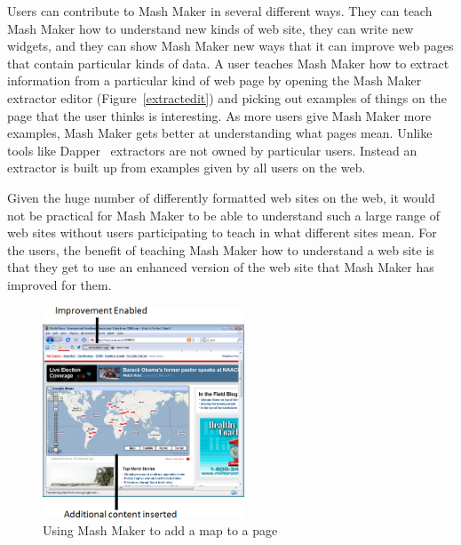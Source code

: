\documentclass{chi2009}
\begin{document}
Users can contribute to Mash Maker in several different ways. They can teach Mash Maker how to understand new kinds of web site, they can write new widgets, and they can show Mash Maker new ways that it can improve web pages that contain particular kinds of data. A user teaches Mash Maker how to extract information from a particular kind of web page by opening the Mash Maker extractor editor (Figure~\ref{extractedit}) and picking out examples of things on the page that the user thinks is interesting. As more users give Mash Maker more examples, Mash Maker gets better at understanding what pages mean. Unlike tools like Dapper~\cite{dapper} extractors are not owned by particular users. Instead an extractor is built up from examples given by all users on the web. 

Given the huge number of differently formatted web sites on the web, it would not be practical for Mash Maker to be able to understand such a large range of web sites without users participating to teach in what different sites mean. For the users, the benefit of teaching Mash Maker how to understand a web site is that they get to use an enhanced version of the web site that Mash Maker has improved for them.


\begin{figure}[tb]
	\begin{center}
	\includegraphics[width=6cm]{../mmpics/mapinsert.png}
	\caption{Using Mash Maker to add a map to a page}
	\label{mapinsert}
	\end{center}
\end{figure}

\end{document}

